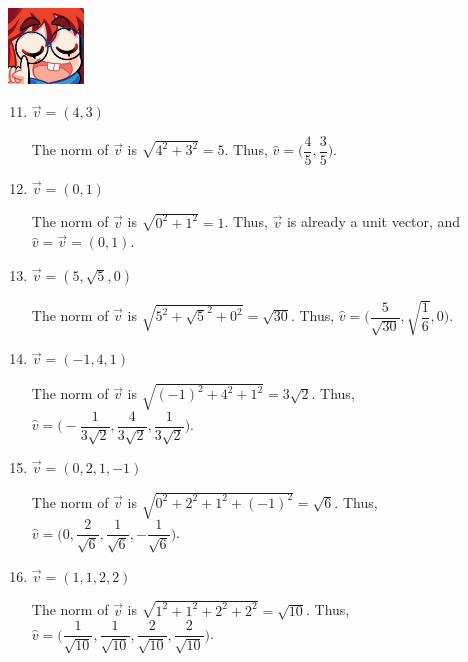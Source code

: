 \documentclass{article}
\begin{document}
\begin{minipage}{.14\textwidth}
    \vspace{0pt}
    \includegraphics[width=2cm]{nerd_maddy.png}
\end{minipage}%
\begin{enumerate}
    \setcounter{enumi}{10} 
    \item \(\overrightarrow{v} = (4,3)\)\begin{solution}
        The norm of \(\overrightarrow{v}\) is \(\sqrt{4^2 + 3^2} = 5\). Thus, \(\hat{v} = \biggl(\dfrac{4}{5}, \dfrac{3}{5}\biggl)\). 
    \end{solution}
    \item \(\overrightarrow{v} = (0,1)\)\begin{solution}
        The norm of \(\overrightarrow{v}\) is \(\sqrt{0^2 + 1^2} = 1\). Thus, \(\overrightarrow{v}\) is already a unit vector, and \(\hat{v} = \overrightarrow{v} = (0,1)\). 
    \end{solution}
    \item \(\overrightarrow{v} = (5,\sqrt{5},0)\)\begin{solution}
        The norm of \(\overrightarrow{v}\) is \(\sqrt{5^2 + {\sqrt{5}}^2 + 0^2} = \sqrt{30}\). Thus, \(\hat{v} = \biggl(\dfrac{5}{\sqrt{30}}, \sqrt{\dfrac{1}{6}}, 0\biggl)\). 
    \end{solution}
    \item \(\overrightarrow{v} = (-1,4,1)\)\begin{solution}
        The norm of \(\overrightarrow{v}\) is \(\sqrt{{(-1)}^2 + 4^2+ 1^2} = 3\sqrt{2}\). Thus, \(\hat{v} = \biggl(-\dfrac{1}{3\sqrt{2}}, \dfrac{4}{3\sqrt{2}}, \dfrac{1}{3\sqrt{2}}\biggl)\). 
    \end{solution}
    \item \(\overrightarrow{v} = (0,2,1,-1)\)\begin{solution}
        The norm of \(\overrightarrow{v}\) is \(\sqrt{0^2 + 2^2 + 1^2 + {(-1)}^2} = \sqrt{6}\). Thus, \(\hat{v} = \biggl(0, \dfrac{2}{\sqrt{6}}, \dfrac{1}{\sqrt{6}}, -\dfrac{1}{\sqrt{6}}\biggl)\). 
    \end{solution}
    \item \(\overrightarrow{v} = (1,1,2,2)\)\begin{solution}
        The norm of \(\overrightarrow{v}\) is \(\sqrt{1^2 + 1^2 + 2^2 + 2^2} = \sqrt{10}\). Thus, \(\hat{v} = \biggl(\dfrac{1}{\sqrt{10}}, \dfrac{1}{\sqrt{10}}, \dfrac{2}{\sqrt{10}}, \dfrac{2}{\sqrt{10}}\biggl)\).
    \end{solution}
\end{enumerate}
\end{document}
